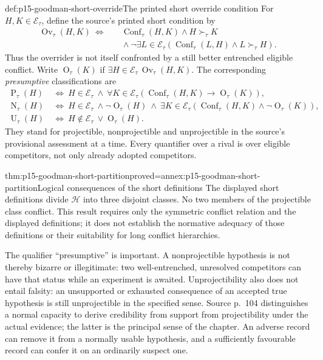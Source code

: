 \begin{hbdefinition}{def:p15-goodman-short-override}{The printed short override condition}
For $H,K\in\mathcal E_\tau$, define the source's printed short
condition by
\[
 \begin{split}
 \operatorname{Ov}_\tau(H,K)\ \Longleftrightarrow\quad&
 \operatorname{Conf}_\tau(H,K)\land H\succ_\tau K\\
 &{}\land\neg\exists L\in\mathcal E_\tau
       (\operatorname{Conf}_\tau(L,H)\land L\succ_\tau H).
 \end{split}
\]
Thus the overrider is not itself confronted by a still better entrenched
eligible conflict. Write $\operatorname{O}_\tau(K)$ if
$\exists H\in\mathcal E_\tau\,\operatorname{Ov}_\tau(H,K)$.
The corresponding \emph{presumptive} classifications are
\[
 \begin{split}
 \operatorname{P}_\tau(H)\ &\Longleftrightarrow\
 H\in\mathcal E_\tau\ \land\
 \forall K\in\mathcal E_\tau
 (\operatorname{Conf}_\tau(H,K)\to\operatorname{O}_\tau(K)),\\
 \operatorname{N}_\tau(H)\ &\Longleftrightarrow\
 H\in\mathcal E_\tau\ \land\neg\operatorname{O}_\tau(H)\ \land\
 \exists K\in\mathcal E_\tau
 (\operatorname{Conf}_\tau(H,K)\land\neg\operatorname{O}_\tau(K)),\\
 \operatorname{U}_\tau(H)\ &\Longleftrightarrow\
 H\notin\mathcal E_\tau\ \lor\operatorname{O}_\tau(H).
 \end{split}
\]
They stand for projectible, nonprojectible and unprojectible in the
source's provisional assessment at a time. Every quantifier over a rival
is over eligible competitors, not only already adopted competitors.
\end{hbdefinition}

\begin{hblemma}{thm:p15-goodman-short-partition}{proved=annex:p15-goodman-short-partition}{Logical consequences of the short definitions}
The displayed short definitions divide $\mathcal H$ into three disjoint
classes. No two members of the projectible class conflict. This result
requires only the symmetric conflict relation and the displayed
definitions; it does not establish the normative adequacy of those
definitions or their suitability for long conflict hierarchies.
\end{hblemma}

The qualifier ``presumptive'' is important. A nonprojectible hypothesis
is not thereby bizarre or illegitimate: two well-entrenched, unresolved
competitors can have that status while an experiment is awaited.
Unprojectibility also does not entail falsity: an unsupported or exhausted
consequence of an accepted true hypothesis is still unprojectible in the
specified sense. Source p.~104 distinguishes a normal capacity to derive
credibility from support from projectibility under the actual evidence;
the latter is the principal sense of the chapter. An adverse record can
remove it from a normally usable hypothesis, and a sufficiently favourable
record can confer it on an ordinarily suspect one.

